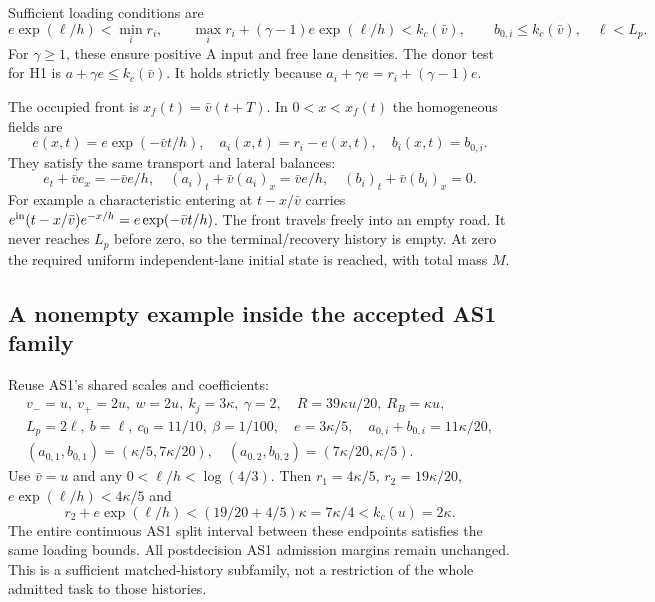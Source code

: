\documentclass[11pt,a4paper]{article}
\newcommand{\kc}{k_c}
\begin{document}
Sufficient loading conditions are
\begin{equation}
 e\exp(\ell/h)<\min_i r_i,\qquad
 \max_i r_i+(\gamma-1)e\exp(\ell/h)<\kc(\bar v),\qquad
 b_{0,i}\leq\kc(\bar v),\quad \ell<L_p.
 \label{eq:loadbounds}
\end{equation}
For $\gamma\geq1$, these ensure positive A input and free lane densities.
The donor test for H1 is $a+\gamma e\leq\kc(\bar v)$.
It holds strictly because $a_i+\gamma e=r_i+(\gamma-1)e$.

The occupied front is $x_f(t)=\bar v(t+T)$. In
$0<x<x_f(t)$ the homogeneous fields are
\begin{equation}
 e(x,t)=e\exp(-\bar vt/h),\quad
 a_i(x,t)=r_i-e(x,t),\quad b_i(x,t)=b_{0,i}.
 \label{eq:fields}
\end{equation}
They satisfy the same transport and lateral balances:
\begin{equation}
 e_t+\bar ve_x=-\bar ve/h,\quad
 (a_i)_t+\bar v(a_i)_x=\bar ve/h,\quad
 (b_i)_t+\bar v(b_i)_x=0.
 \label{eq:pde}
\end{equation}
For example a characteristic entering at $t-x/\bar v$ carries
$e^{\rm in}(t-x/\bar v)e^{-x/h}=e\exp(-\bar vt/h)$.
The front travels freely into an empty road. It never reaches $L_p$ before
zero, so the terminal/recovery history is empty. At zero the required
uniform independent-lane initial state is reached, with total mass $M$.

\subsection{A nonempty example inside the accepted AS1 family}
Reuse AS1's shared scales and coefficients:
\begin{equation}
 \begin{gathered}
 v_-=u,\ v_+=2u,\ w=2u,\ k_j=3\kappa,\ \gamma=2,\quad
 R=39\kappa u/20,\ R_B=\kappa u,\\
 L_p=2\ell,\ b=\ell,\ c_0=11/10,\ \beta=1/100,\quad
 e=3\kappa/5,\quad a_{0,i}+b_{0,i}=11\kappa/20,\\
 (a_{0,1},b_{0,1})=(\kappa/5,7\kappa/20),\quad
 (a_{0,2},b_{0,2})=(7\kappa/20,\kappa/5).
 \end{gathered} \label{eq:pair}
\end{equation}
Use $\bar v=u$ and any $0<\ell/h<\log(4/3)$.
Then $r_1=4\kappa/5$, $r_2=19\kappa/20$,
$e\exp(\ell/h)<4\kappa/5$ and
\begin{equation}
 r_2+e\exp(\ell/h)<(19/20+4/5)\kappa
 =7\kappa/4<\kc(u)=2\kappa.
 \label{eq:examplebounds}
\end{equation}
The entire continuous AS1 split interval between these endpoints satisfies
the same loading bounds. All postdecision AS1 admission margins remain
unchanged. This is a sufficient matched-history subfamily, not a restriction
of the whole admitted task to those histories.
\end{document}

